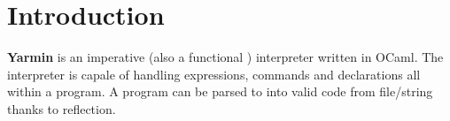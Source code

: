 \chapter{ Introduction }

 \textbf{Yarmin} is an imperative (also a functional ) interpreter written in OCaml.\newline
 The interpreter is capale of handling expressions, commands and declarations all within a program.
 \newline
 A program can be parsed to into valid code from file/string thanks to reflection.
\newline
\newline
\newline
